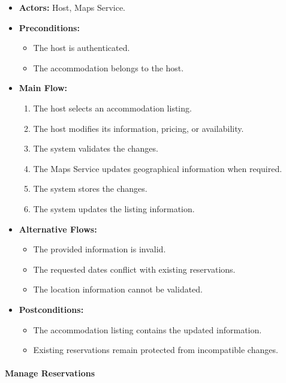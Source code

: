 \begin{itemize}
    \item \textbf{Actors:} Host, Maps Service.
    
    \item \textbf{Preconditions:}
    \begin{itemize}
        \item The host is authenticated.
        \item The accommodation belongs to the host.
    \end{itemize}
    
    \item \textbf{Main Flow:}
    \begin{enumerate}
        \item The host selects an accommodation listing.
        \item The host modifies its information, pricing, or availability.
        \item The system validates the changes.
        \item The Maps Service updates geographical information when required.
        \item The system stores the changes.
        \item The system updates the listing information.
    \end{enumerate}
    
    \item \textbf{Alternative Flows:}
    \begin{itemize}
        \item The provided information is invalid.
        \item The requested dates conflict with existing reservations.
        \item The location information cannot be validated.
    \end{itemize}
    
    \item \textbf{Postconditions:}
    \begin{itemize}
        \item The accommodation listing contains the updated information.
        \item Existing reservations remain protected from incompatible changes.
    \end{itemize}
\end{itemize}


\paragraph{Manage Reservations}

